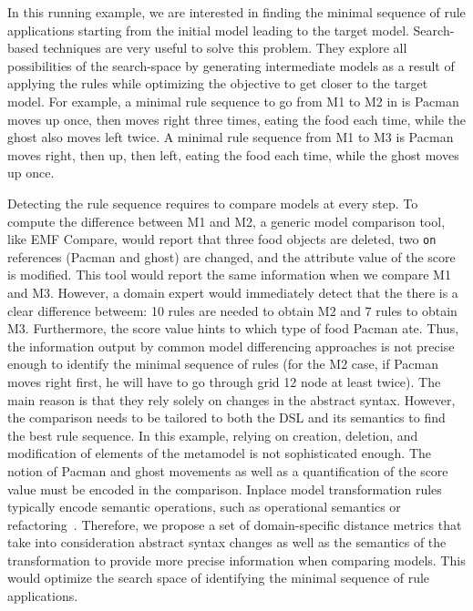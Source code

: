 In this running example, we are interested in finding the minimal sequence of rule applications starting from the initial model leading to the target model.
Search-based techniques are very useful to solve this problem.
They explore all possibilities of the search-space by generating intermediate models as a result of applying the rules while optimizing the objective to get closer to the target model.
For example, a minimal rule sequence to go from M1 to M2 in  is Pacman moves up once, then moves right three times, eating the food each time, while the ghost also moves left twice.
A minimal rule sequence from M1 to M3 is Pacman moves right, then up, then left, eating the food each time, while the ghost moves up once.

Detecting the rule sequence requires to compare models at every step.
To compute the difference between M1 and M2, a generic model comparison tool, like EMF Compare, would report that three food objects are deleted, two \texttt{on} references (Pacman and ghost) are changed, and the attribute value of the score is modified.
This tool would report the same information when we compare M1 and M3.
However, a domain expert would immediately detect that the there is a clear difference betweem: 10 rules are needed to obtain M2 and 7 rules to obtain M3.
Furthermore, the score value hints to which type of food Pacman ate.
Thus, the information output by common model differencing approaches is not precise enough to identify the minimal sequence of rules (\eg for the M2 case, if Pacman moves right first, he will have to go through grid 12 node at least twice).
The main reason is that they rely solely on changes in the abstract syntax.
However, the comparison needs to be tailored to both the DSL and its semantics to find the best rule sequence.
In this example, relying on creation, deletion, and modification of elements of the metamodel is not sophisticated enough.
The notion of Pacman and ghost movements as well as a quantification of the score value must be encoded in the comparison.
Inplace model transformation rules typically encode semantic operations, such as operational semantics or refactoring~\cite{Lucio2016}.
Therefore, we propose a set of domain-specific distance metrics that take into consideration abstract syntax changes as well as the semantics of the transformation to provide more precise information when comparing models.
This would optimize the search space of identifying the minimal sequence of rule applications.